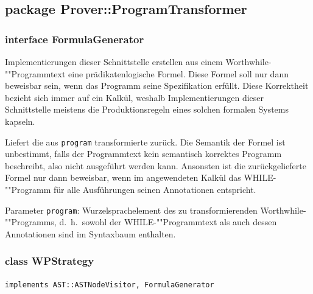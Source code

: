 \subsection{package Prover::ProgramTransformer}%

\subsubsection{interface FormulaGenerator}%

Implementierungen dieser Schnittstelle erstellen aus einem
Worthwhile-""Programmtext eine prädikatenlogische Formel. Diese Formel
soll nur dann beweisbar sein, wenn das Programm seine Spezifikation
erfüllt. Diese Korrektheit bezieht sich immer auf ein Kalkül, weshalb
Implementierungen dieser Schnittstelle meistens die Produktionsregeln
eines solchen formalen Systems kapseln.%

\begin{description}%

    Liefert die aus \texttt{program} transformierte 
    zurück. Die Semantik der Formel ist unbestimmt, falls der
    Programmtext kein semantisch korrektes Programm beschreibt, also
    nicht ausgeführt werden kann. Ansonsten ist die zurückgelieferte
    Formel nur dann beweisbar, wenn im angewendeten Kalkül das
    WHILE-""Programm für alle Ausführungen seinen Annotationen
    entspricht.%

    Parameter \texttt{program}: Wurzelsprachelement des zu
    transformierenden Worthwhile-""Programms, d.~h.\ sowohl der
    WHILE-""Programmtext als auch dessen Annotationen sind im
    Syntaxbaum enthalten.%

\end{description}%

\subsubsection{class WPStrategy}%

\texttt{implements AST::ASTNodeVisitor, FormulaGenerator}%


\begin{description}%

\end{description}%


